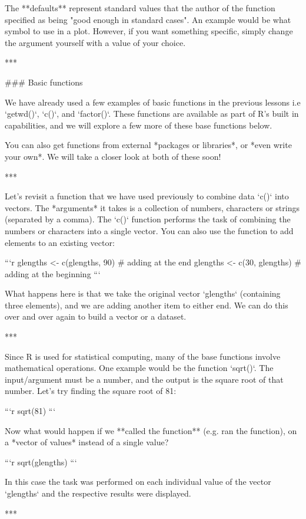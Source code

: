 {{The **defaults** represent standard values that the author of the function specified as being "good enough in standard cases". An example would be what symbol to use in a plot. However, if you want something specific, simply change the argument yourself with a value of your choice.

***

### Basic functions

We have already used a few examples of basic functions in the previous lessons i.e `getwd()`, `c()`, and  `factor()`. These functions are available as part of R's built in capabilities, and we will explore a few more of these base functions below. 

You can also get functions from external *packages or libraries*, or *even write your own*. We will take a closer look at both of these soon!

***

Let's revisit a function that we have used previously to combine data `c()` into vectors. The *arguments* it takes is a collection of numbers, characters or strings (separated by a comma). The `c()` function performs the task of combining the numbers or characters into a single vector. You can also use the function to add elements to an existing vector:

```r
glengths <- c(glengths, 90) # adding at the end	
glengths <- c(30, glengths) # adding at the beginning
```

What happens here is that we take the original vector `glengths` (containing three elements), and we are adding another item to either end. We can do this over and over again to build a vector or a dataset.

***

Since R is used for statistical computing, many of the base functions involve mathematical operations. One example would be the function `sqrt()`. The input/argument must be a number, and the output is the square root of that number. Let's try finding the square root of 81:

```r
sqrt(81)
```

Now what would happen if we **called the function** (e.g. ran the function), on a *vector of values* instead of a single value? 

```r
sqrt(glengths)
```

In this case the task was performed on each individual value of the vector `glengths` and the respective results were displayed.

***

}}

